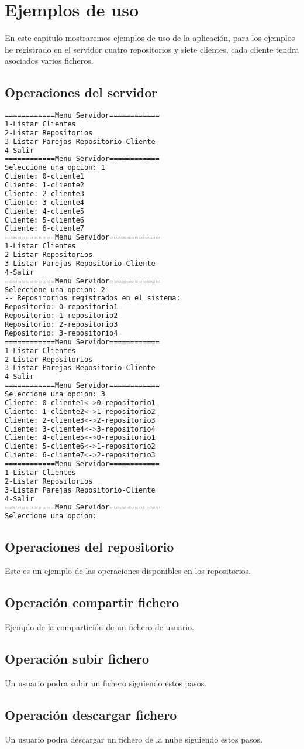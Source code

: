 \chapter{Ejemplos de uso}

En este capitulo mostraremos ejemplos de uso de la aplicación, para los ejemplos he registrado en el servidor cuatro repositorios y siete clientes, cada cliente tendra asociados varios ficheros.

\section{Operaciones del servidor}
\begin{lstlisting}[language=bash,frame=single,texcl=true,basicstyle=\small]
============Menu Servidor============
1-Listar Clientes
2-Listar Repositorios
3-Listar Parejas Repositorio-Cliente
4-Salir
============Menu Servidor============
Seleccione una opcion: 1
Cliente: 0-cliente1
Cliente: 1-cliente2
Cliente: 2-cliente3
Cliente: 3-cliente4
Cliente: 4-cliente5
Cliente: 5-cliente6
Cliente: 6-cliente7
============Menu Servidor============
1-Listar Clientes
2-Listar Repositorios
3-Listar Parejas Repositorio-Cliente
4-Salir
============Menu Servidor============
Seleccione una opcion: 2
-- Repositorios registrados en el sistema: 
Repositorio: 0-repositorio1
Repositorio: 1-repositorio2
Repositorio: 2-repositorio3
Repositorio: 3-repositorio4
============Menu Servidor============
1-Listar Clientes
2-Listar Repositorios
3-Listar Parejas Repositorio-Cliente
4-Salir
============Menu Servidor============
Seleccione una opcion: 3
Cliente: 0-cliente1<->0-repositorio1
Cliente: 1-cliente2<->1-repositorio2
Cliente: 2-cliente3<->2-repositorio3
Cliente: 3-cliente4<->3-repositorio4
Cliente: 4-cliente5<->0-repositorio1
Cliente: 5-cliente6<->1-repositorio2
Cliente: 6-cliente7<->2-repositorio3
============Menu Servidor============
1-Listar Clientes
2-Listar Repositorios
3-Listar Parejas Repositorio-Cliente
4-Salir
============Menu Servidor============
Seleccione una opcion: 
\end{lstlisting}


\section{Operaciones del repositorio}
Este es un ejemplo de las operaciones disponibles en los repositorios.

\section{Operación compartir fichero}
Ejemplo de la compartición de un fichero de usuario.

\section{Operación subir fichero}
Un usuario podra subir un fichero siguiendo estos pasos.

\section{Operación descargar fichero}
Un usuario podra descargar un fichero de la nube siguiendo estos pasos.
